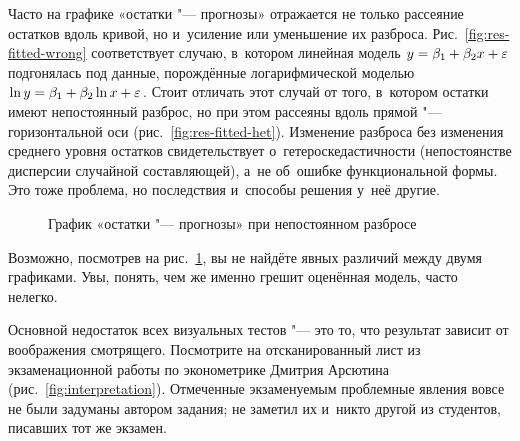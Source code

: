 \documentclass[11pt]{article}
\begin{document}
Часто на графике «остатки "--- прогнозы» отражается не только рассеяние остатков вдоль кривой, но и~усиление или уменьшение их разброса. Рис.~\ref{fig:res-fitted-wrong} соответствует случаю, в~котором линейная модель $y = \beta_1 + \beta_2 x + \varepsilon$ подгонялась под данные, порождённые логарифмической моделью $\ln y = \beta_1 + \beta_2 \ln x + \varepsilon$. Стоит отличать этот случай от того, в~котором остатки имеют непостоянный разброс, но при этом рассеяны вдоль прямой "--- горизонтальной оси (рис.~\ref{fig:res-fitted-het}). Изменение разброса без изменения среднего уровня остатков свидетельствует о~гетероскедастичности (непостоянстве дисперсии случайной составляющей), а~не об~ошибке функциональной формы. Это тоже проблема, но последствия и~способы решения у~неё другие.

\begin{figure}[htbp]
	\centering
	 \quad
	\caption{График «остатки "--- прогнозы» при непостоянном разбросе}\label{fig:wrong}
\end{figure}

Возможно, посмотрев на рис.~\ref{fig:wrong}, вы не найдёте явных различий между двумя графиками. Увы, понять, чем же именно грешит оценённая модель, часто нелегко.

Основной недостаток всех визуальных тестов "--- это то, что результат зависит от воображения смотрящего. Посмотрите на отсканированный лист из экзаменационной работы по эконометрике Дмитрия Арсютина (рис.~\ref{fig:interpretation}). Отмеченные экзаменуемым проблемные явления вовсе не были задуманы автором задания; не заметил их и~никто другой из студентов, писавших тот же экзамен.
\end{document}
